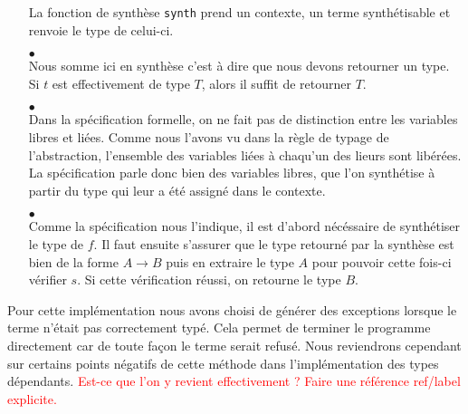 \documentclass {article}
\newcommand{\codefrom}[3]
           {}
\theoremstyle{definition}
\theoremstyle{remark}
\newcommand{\todo}[1]{\textcolor{red}{#1}}
\begin{document}
\begin{itemize}
La fonction de synthèse \lstinline!synth! prend un contexte, un
terme synthétisable et renvoie le type de celui-ci.

 \codefrom{typed}{lambda}{synth_def}

\item[$\bullet$]  \\

  Nous somme ici en synthèse c'est à dire que nous devons retourner un type.
  Si $t$ est effectivement de type $T$, alors il suffit de retourner $T$.
\codefrom{typed}{lambda}{synth_ann}



\item[$\bullet$] \\

Dans la spécification formelle, on ne fait pas de distinction entre
les variables libres et liées.  Comme nous l'avons vu dans la règle de
typage de l'abstraction, l'ensemble des variables liées à chaqu'un des
lieurs sont libérées. La spécification parle donc bien des variables
libres, que l'on synthétise à partir  du type qui leur a été assigné dans le contexte.
%
\codefrom{typed}{lambda}{synth_var}

\item[$\bullet$] \\

  
  Comme la spécification nous l'indique, il est d'abord nécéssaire de synthétiser le type de $f$.
  Il faut ensuite s'assurer que le type retourné par la synthèse est bien de la forme $A\rightarrow B$
  puis en extraire le type $A$ pour pouvoir cette fois-ci vérifier $s$. Si cette vérification réussi,
  on retourne le type $B$.
 
\codefrom{typed}{lambda}{synth_appl}

\end{itemize}

Pour cette implémentation nous avons choisi de générer des exceptions
lorsque le terme n'était pas correctement typé. Cela permet de
terminer le programme directement car de toute façon le terme serait
refusé. Nous reviendrons cependant sur certains points négatifs de
cette méthode dans l'implémentation des types dépendants. \todo{Est-ce
  que l'on y revient effectivement ? Faire une référence ref/label
  explicite.}
\end{document}
